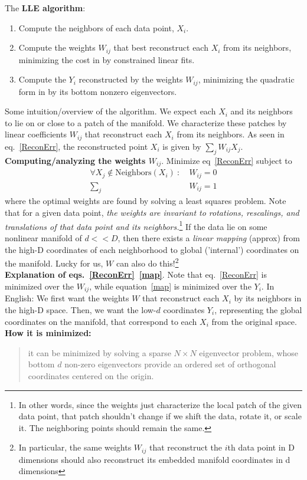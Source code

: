 \documentclass[12pt]{article}
\begin{document}
\p The \textbf{LLE algorithm}:
\begin{enumerate}
	\item Compute the neighbors of each data point, $X_i$. 
	\item Compute the weights $W_{ij}$ that best reconstruct each $X_i$ from its neighbors, minimizing the cost in
	by constrained linear fits. 
	\item Compute the $Y_i$ reconstructed by the weights $W_{ij}$, minimizing the quadratic form in
	by its bottom nonzero eigenvectors. 
\end{enumerate}

\p Some intuition/overview of the algorithm. We expect each $X_i$ and its neighbors to lie on or close to a  patch of the manifold. We characterize these patches by linear coefficients $W_{ij}$ that reconstruct each $X_i$ from its neighbors. As seen in eq.~\ref{ReconErr}, the reconstructed point $X_i$ is given by $\sum_j W_{ij} X_j$.  \\

\p \textbf{Computing/analyzing the weights $W_{ij}$}. Minimize eq~\ref{ReconErr} subject to 
	\begin{align}
		\forall X_j \notin \text{Neighbors}(X_i) ~ : ~ &W_{ij} = 0 \\
		\sum_j ~ &W_{ij} = 1 
	\end{align}
where the optimal weights are found by solving a least squares problem. Note that for a given data point, \textit{the weights are invariant to rotations, rescalings, and translations of that data point and its neighbors.}\footnote{In other words, since the weights just characterize the local patch of the given data point, that patch shouldn't change if we shift the data, rotate it, or scale it. The neighboring points should remain the same.} If the data lie on some nonlinear manifold of $d << D$, then there exists a \textit{linear mapping} (approx) from the high-D coordinates of each neighborhood to global ('internal') coordinates on the manifold. Lucky for us, $W$ can also do this!\footnote{In particular, the same weights $W_{ij}$ that reconstruct the $i$th data point in D dimensions should also reconstruct its embedded manifold coordinates in d dimensions} \\

\p \textbf{Explanation of eqs.~\ref{ReconErr}~\ref{map}}. Note that eq.~\ref{ReconErr} is minimized over the $W_{ij}$, while equation~\ref{map} is minimized over the $Y_i$. In English: We first want the weights $W$ that reconstruct each $X_i$ by its neighbors in the high-D space. Then, we want the low-$d$ coordinates $Y_i$, representing the global coordinates on the manifold, that correspond to each $X_i$ from the original space. \textbf{How it is minimized:}
	\begin{quote}
		it can be minimized by solving a sparse $N \times N$ eigenvector problem, whose bottom $d$ non-zero eigenvectors provide an ordered set of orthogonal coordinates centered on the origin.
	\end{quote}
	
\end{document}
